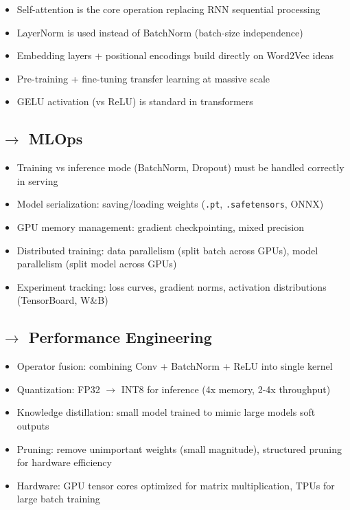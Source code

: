 \documentclass[11pt]{article}
\providecommand{\tightlist}{\setlength{\itemsep}{1pt}\setlength{\parskip}{0pt}}
\begin{document}
\begin{itemize}
\tightlist
\item
  Self-attention is the core operation replacing RNN sequential processing
\item
  LayerNorm is used instead of BatchNorm (batch-size independence)
\item
  Embedding layers + positional encodings build directly on Word2Vec ideas
\item
  Pre-training + fine-tuning transfer learning at massive scale
\item
  GELU activation (vs ReLU) is standard in transformers
\end{itemize}

\subsection{\texorpdfstring{\(\rightarrow\) MLOps}{\textbackslash rightarrow MLOps}}\label{rightarrow-mlops}

\begin{itemize}
\tightlist
\item
  Training vs inference mode (BatchNorm, Dropout) must be handled correctly in serving
\item
  Model serialization: saving/loading weights (\texttt{.pt}, \texttt{.safetensors}, ONNX)
\item
  GPU memory management: gradient checkpointing, mixed precision
\item
  Distributed training: data parallelism (split batch across GPUs), model parallelism (split model across GPUs)
\item
  Experiment tracking: loss curves, gradient norms, activation distributions (TensorBoard, W\&B)
\end{itemize}

\subsection{\texorpdfstring{\(\rightarrow\) Performance Engineering}{\textbackslash rightarrow Performance Engineering}}\label{rightarrow-performance-engineering}

\begin{itemize}
\tightlist
\item
  Operator fusion: combining Conv + BatchNorm + ReLU into single kernel
\item
  Quantization: FP32 \(\rightarrow\) INT8 for inference (4x memory, 2-4x throughput)
\item
  Knowledge distillation: small model trained to mimic large model\textquotesingle s soft outputs
\item
  Pruning: remove unimportant weights (small magnitude), structured pruning for hardware efficiency
\item
  Hardware: GPU tensor cores optimized for matrix multiplication, TPUs for large batch training
\end{itemize}
\end{document}
